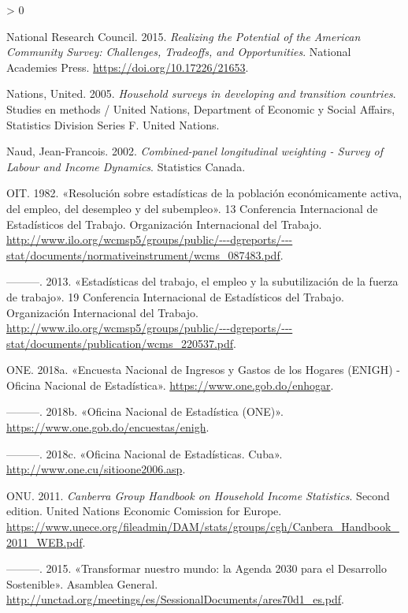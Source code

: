 \documentclass[
  12pt,
  spanish,
]{book}
\newlength{\cslhangindent}
\newenvironment{CSLReferences}[2] %
 {%
  \setlength{\parindent}{0pt}
  \ifodd #1 \everypar{\setlength{\hangindent}{\cslhangindent}}\ignorespaces\fi
  \ifnum #2 > 0
  \setlength{\parskip}{#2\baselineskip}
  \fi
 }%
 {}
\begin{document}
\begin{CSLReferences}{1}{0}
\leavevmode\hypertarget{ref-AmericanCommunitySurvey}{}%
National Research Council. 2015. \emph{Realizing the Potential of the American Community Survey: Challenges, Tradeoffs, and Opportunities}. National Academies Press. \url{https://doi.org/10.17226/21653}.

\leavevmode\hypertarget{ref-United_Nations_2005}{}%
Nations, United. 2005. \emph{Household surveys in developing and transition countries}. Studies en methods / United Nations, Department of Economic y Social Affairs, Statistics Division Series F. United Nations.

\leavevmode\hypertarget{ref-Naud_2002}{}%
Naud, Jean-Francois. 2002. \emph{Combined-panel longitudinal weighting - Survey of Labour and Income Dynamics}. Statistics Canada.

\leavevmode\hypertarget{ref-OIT_1982}{}%
OIT. 1982. {«Resolución sobre estadísticas de la población económicamente activa, del empleo, del desempleo y del subempleo»}. 13 Conferencia Internacional de Estadísticos del Trabajo. Organización Internacional del Trabajo. \url{http://www.ilo.org/wcmsp5/groups/public/---dgreports/---stat/documents/normativeinstrument/wcms_087483.pdf}.

\leavevmode\hypertarget{ref-OIT_2013}{}%
---------. 2013. {«Estadísticas del trabajo, el empleo y la subutilización de la fuerza de trabajo»}. 19 Conferencia Internacional de Estadísticos del Trabajo. Organización Internacional del Trabajo. \url{http://www.ilo.org/wcmsp5/groups/public/---dgreports/---stat/documents/publication/wcms_220537.pdf}.

\leavevmode\hypertarget{ref-ONE-DO}{}%
ONE. 2018a. {«Encuesta Nacional de Ingresos y Gastos de los Hogares (ENIGH) - Oficina Nacional de Estadística»}. \url{https://www.one.gob.do/enhogar}.

\leavevmode\hypertarget{ref-ONE2-DO}{}%
---------. 2018b. {«Oficina Nacional de Estadística (ONE)»}. \url{https://www.one.gob.do/encuestas/enigh}.

\leavevmode\hypertarget{ref-ONE-CU}{}%
---------. 2018c. {«Oficina Nacional de Estadísticas. Cuba»}. \url{http://www.one.cu/sitioone2006.asp}.

\leavevmode\hypertarget{ref-United-Nations_2011}{}%
ONU. 2011. \emph{Canberra Group Handbook on Household Income Statistics}. Second edition. United Nations Economic Comission for Europe. \url{https://www.unece.org/fileadmin/DAM/stats/groups/cgh/Canbera_Handbook_2011_WEB.pdf}.

\leavevmode\hypertarget{ref-United_Nations_2015}{}%
---------. 2015. {«Transformar nuestro mundo: la Agenda 2030 para el Desarrollo Sostenible»}. Asamblea General. \url{http://unctad.org/meetings/es/SessionalDocuments/ares70d1_es.pdf}.


\end{CSLReferences}
\end{document}
